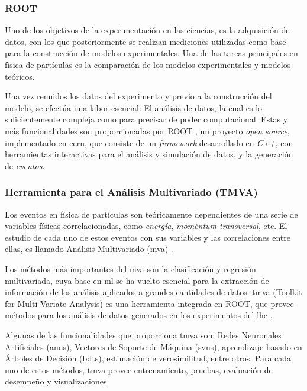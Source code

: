 \subsubsection{ROOT}

Uno de los objetivos de la experimentación en las ciencias, es la adquisición de datos, con los que posteriormente se realizan mediciones utilizadas como base para la construcción de modelos experimentales. Una de las tareas principales en física de partículas es la comparación de los modelos experimentales y modelos teóricos.

Una vez reunidos los datos del experimento y previo a la construcción del modelo, se efectúa una labor esencial: El análisis de datos, la cual es lo suficientemente compleja como para precisar de poder computacional. Estas y más funcionalidades son proporcionadas por ROOT \cite{Brun1997}, un proyecto \emph{open source}, implementado en \acrshort{cern}, que consiste de un \emph{framework} desarrollado en \emph{C++}, con herramientas interactivas para el análisis y simulación de datos, y la generación de \emph{eventos}.

\subsubsection{Herramienta para el Análisis Multivariado (TMVA)}

Los eventos en física de partículas son teóricamente dependientes de una serie de variables físicas correlacionadas, como \textit{energía}, \textit{moméntum transversal}, etc. El estudio de cada uno de estos eventos con sus variables y las correlaciones entre ellas, es llamado Análisis Multivariado (\acrshort{mva}) \cite{Bhat2011}.

Los métodos más importantes del \acrshort{mva} son la clasificación y regresión multivariada, cuya base en \acrshort{ml} se ha vuelto esencial para la extracción de información de los análisis aplicados a grandes cantidades de datos. \acrshort{tmva} (Toolkit for Multi-Variate Analysis) \cite{Hocker2007} es una herramienta integrada en ROOT, que provee métodos para los análisis de datos generados en los experimentos del \acrshort{lhc} \cite{Hocker2007}.

Algunas de las funcionalidades que proporciona \acrshort{tmva} son: Redes Neuronales Artificiales (\acrshort{ann}s), Vectores de Soporte de Máquina (\acrshort{svn}s), aprendizaje basado en Árboles de Decisión (\acrshort{bdt}s), estimación de verosimilitud, entre otros. Para cada uno de estos métodos, \acrshort{tmva} provee entrenamiento, pruebas, evaluación de desempeño y visualizaciones.

